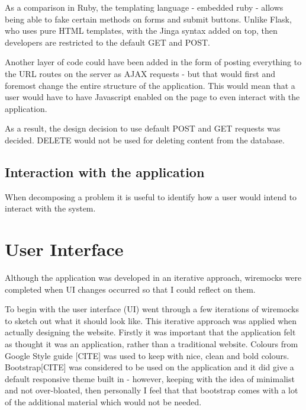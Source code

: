 As a comparison in Ruby, the templating language - embedded ruby - allows being able to fake certain methods on forms and submit buttons. Unlike Flask, who uses pure HTML templates, with the Jinga syntax added on top, then developers are restricted to the default GET and POST.

Another layer of code could have been added in the form of posting everything to the URL routes on the server as AJAX requests - but that would first and foremost change the entire structure of the application. This would mean that a user would have to have Javascript enabled on the page to even interact with the application.

As a result, the design decision to use default POST and GET requests was decided. DELETE would not be used for deleting content from the database.

\subsection{Interaction with the application}
When decomposing a problem it is useful to identify how a user would intend to interact with the system.





\section{User Interface}
Although the application was developed in an iterative approach, wiremocks were completed when UI changes occurred so that I could reflect on them.

To begin with the user interface (UI) went through a few iterations of wiremocks to sketch out what it should look like.  This iterative approach was applied when actually designing the website. Firstly it was important that the application felt as thought it was an application, rather than a traditional website. Colours from Google Style guide [CITE] was used to keep with nice, clean and bold colours. Bootstrap[CITE] was considered to be used on the application and it did give a default responsive theme built in - however, keeping with the idea of minimalist and not over-bloated, then personally I feel that that bootstrap comes with a lot of the additional material which would not be needed.


